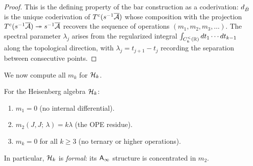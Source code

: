 \begin{proof}
This is the defining property of the bar construction as a
coderivation: $d_{\bar{B}}$ is the unique coderivation of
$T^c(s^{-1}\overline{\mathcal{A}})$ whose composition with the
projection $T^c(s^{-1}\overline{\mathcal{A}}) \twoheadrightarrow
s^{-1}\overline{\mathcal{A}}$ recovers the sequence of operations
$(m_1, m_2, m_3, \ldots)$.  The spectral parameter
$\lambda_j$ arises from the regularized integral
$\int_{C_k^{<}(\mathbb{R})} dt_1 \cdots dt_{k-1}$
along the topological direction, with $\lambda_j = t_{j+1} - t_j$
recording the separation between consecutive points.
\end{proof}

We now compute all $m_k$ for $\mathcal{H}_k$.

\begin{proposition}
\label{prop:rosetta-heisenberg-mk}
For the Heisenberg algebra $\mathcal{H}_k$:
\begin{enumerate}[label=\textup{(\roman*)}]
\item $m_1 = 0$ \textup{(}no internal differential\textup{)}.
\item $m_2(J, J;\, \lambda) = k\lambda$
  \textup{(}the OPE residue\textup{)}.
\item $m_k = 0$ for all $k \geq 3$
  \textup{(}no ternary or higher operations\textup{)}.
\end{enumerate}
In particular, $\mathcal{H}_k$ is \emph{formal}: its $\mathsf{A}_{\infty}$ structure is
concentrated in $m_2$.
\end{proposition}

